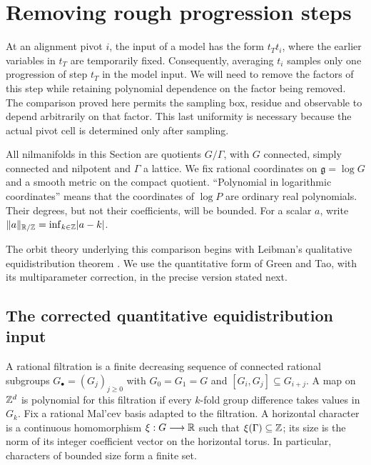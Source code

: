 \section{Removing rough progression steps}
\label{sec:rough-progressions}

At an alignment pivot $i$, the input of a model has the form $t_Tt_i$, where
the earlier variables in $t_T$ are temporarily fixed.  Consequently,
averaging $t_i$ samples only one progression of step $t_T$ in the
model input.  We will need to remove the factors of this step while
retaining polynomial dependence on the factor being removed.  The
comparison proved here permits the sampling box, residue and observable
to depend arbitrarily on that factor.  This last uniformity is necessary
because the actual pivot cell is determined only after sampling.

All nilmanifolds in this Section are quotients $G/\Gamma$, with $G$
connected, simply connected and nilpotent and $\Gamma$ a lattice.  We fix
rational coordinates on $\mathfrak g=\log G$ and a smooth metric on the
compact quotient.  ``Polynomial in logarithmic coordinates'' means that
the coordinates of $\log P$ are ordinary real polynomials.  Their degrees,
but not their coefficients, will be bounded.  For a scalar $a$, write
$\lVert a\rVert_{\mathbb R/\mathbb Z}=\inf_{k\in\mathbb Z}\lvert a-k\rvert$.

The orbit theory underlying this comparison begins with Leibman's
qualitative equidistribution theorem \cite{LeibmanOrbits}.
We use the quantitative form of Green and Tao, with its multiparameter
correction, in the precise version stated next.

\subsection{The corrected quantitative equidistribution input}

A rational filtration is a finite decreasing sequence of connected
rational subgroups $G_\bullet=(G_j)_{j\geq0}$ with
$G_0=G_1=G$ and $[G_i,G_j]\subseteq G_{i+j}$.  A map on $\mathbb Z^d$ is
polynomial for this filtration if every $k$-fold group difference takes
values in $G_k$.  Fix a rational Mal'cev basis adapted to the filtration.
A horizontal character is a continuous homomorphism
$\xi:G\longrightarrow\mathbb R$ such that $\xi(\Gamma)\subseteq\mathbb Z$; its
size is the norm of its integer coefficient vector on the horizontal
torus.  In particular, characters of bounded size form a finite set.

